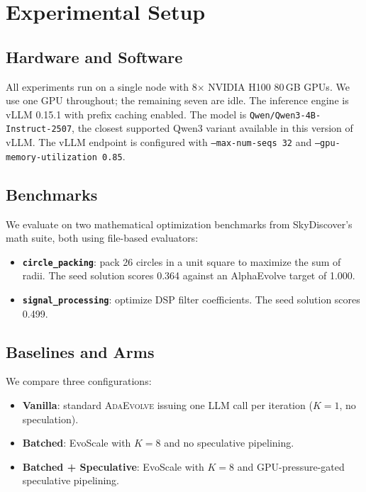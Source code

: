 \documentclass{article}
\newcommand{\adaev}{\textsc{AdaEvolve}}
\begin{document}
\section{Experimental Setup}

\subsection{Hardware and Software}

All experiments run on a single node with 8$\times$ NVIDIA H100 80\,GB
GPUs. We use one GPU throughout; the remaining seven are idle. The
inference engine is vLLM 0.15.1 with prefix caching enabled. The model
is \texttt{Qwen/Qwen3-4B-Instruct-2507}, the closest supported Qwen3
variant available in this version of vLLM. The vLLM endpoint is
configured with \texttt{--max-num-seqs 32} and
\texttt{--gpu-memory-utilization 0.85}.

\subsection{Benchmarks}

We evaluate on two mathematical optimization benchmarks from
SkyDiscover's math suite, both using file-based evaluators:

\begin{itemize}
    \item \textbf{\texttt{circle\_packing}}: pack 26 circles in a unit
    square to maximize the sum of radii. The seed solution scores 0.364
    against an AlphaEvolve target of 1.000.
    \item \textbf{\texttt{signal\_processing}}: optimize DSP filter
    coefficients. The seed solution scores 0.499.
\end{itemize}

\subsection{Baselines and Arms}

We compare three configurations:

\begin{itemize}
    \item \textbf{Vanilla}: standard \adaev{} issuing one LLM call per
    iteration ($K{=}1$, no speculation).
    \item \textbf{Batched}: EvoScale with $K{=}8$ and no speculative
    pipelining.
    \item \textbf{Batched + Speculative}: EvoScale with $K{=}8$ and
    GPU-pressure-gated speculative pipelining.
\end{itemize}
\end{document}
